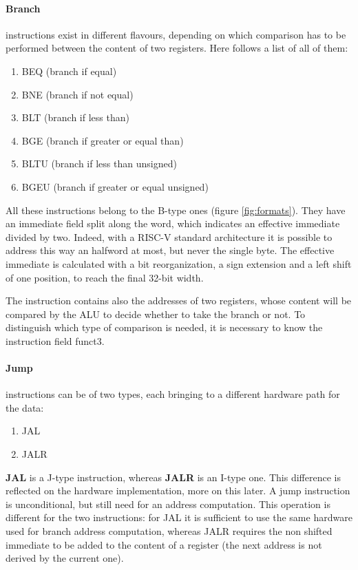 \documentclass[a4paper]{article}
\begin{document}
\paragraph{Branch} instructions exist in different flavours, depending on which comparison has to be performed between the content of two registers. Here follows a list of all of them:
\begin{enumerate}
	\item BEQ (branch if equal)
	\item BNE (branch if not equal)
	\item BLT (branch if less than)
	\item BGE (branch if greater or equal than)
	\item BLTU (branch if less than unsigned)
	\item BGEU (branch if greater or equal unsigned)
\end{enumerate}
All these instructions belong to the B-type ones (figure \ref{fig:formats}). They have an immediate field split along the word, which indicates an effective immediate divided by two. Indeed, with a RISC-V standard architecture it is possible to address this way an halfword at most, but never the single byte.
The effective immediate is calculated with a bit reorganization, a sign extension and a left shift of one position, to reach the final 32-bit width.

The instruction contains also the addresses of two registers, whose content will be compared by the ALU to decide whether to take the branch or not.
To distinguish which type of comparison is needed, it is necessary to know the instruction field funct3.

\paragraph{Jump} instructions can be of two types, each bringing to a different hardware path for the data:
\begin{enumerate}
	\item JAL
	\item JALR
\end{enumerate}
\textbf{JAL} is a J-type instruction, whereas \textbf{JALR} is an I-type one. This difference is reflected on the hardware implementation, more on this later.
A jump instruction is unconditional, but still need for an address computation. This operation is different for the two instructions: for JAL it is sufficient to use the same hardware used for branch address computation, whereas JALR requires the non shifted immediate to be added to the content of a register (the next address is not derived by the current one).
\end{document}
